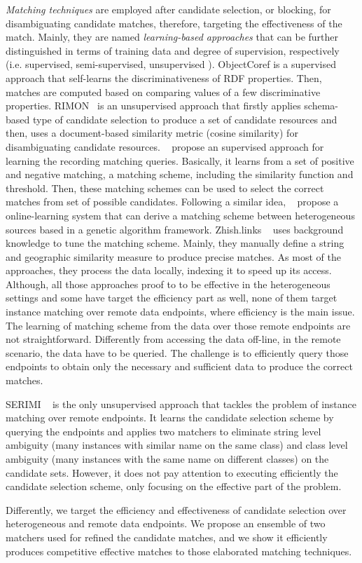 \emph{Matching techniques} are employed after candidate selection, or blocking, for disambiguating candidate matches, therefore, targeting the effectiveness of the match. Mainly, they are named \emph{learning-based approaches} that can be further distinguished in terms of training data and degree of supervision, respectively (i.e. supervised, semi-supervised, unsupervised \cite{bernstein_discovering_2009,Song:2011:AGD:2063016.2063058,Niu:2011:ZWC:2063076.2063091}). ObjectCoref\cite{hu_bootstrapping_2011} is a supervised approach that self-learns the discriminativeness of RDF properties. Then, matches are computed based on comparing values of a few discriminative properties. RIMON~\cite{juanzi_li_rimom:_2009} is an unsupervised approach that firstly applies schema-based type of candidate selection to produce a set of candidate resources and then, uses a document-based similarity metric (cosine similarity) for disambiguating candidate resources. ~\cite{DBLP:conf/vldb/ChaudhuriCGK07} propose an supervised approach for learning the recording matching queries. Basically, it learns from a set of positive and negative matching, a matching scheme, including the similarity function and threshold. Then, these matching schemes can be used to select the correct matches from set of possible candidates. Following a similar idea, ~\cite{DBLP:conf/esws/NikolovdM12} propose a online-learning system that can derive a matching scheme between heterogeneous sources based in a genetic algorithm framework. Zhish.links ~\cite{DBLP:conf/semweb/NiuRZW11} uses background knowledge to tune the matching scheme. Mainly, they manually define a string and geographic similarity measure to produce precise matches. As most of the approaches, they process the data locally, indexing it to speed up its access. Although, all those approaches proof to to be effective in the heterogeneous settings and some have target the efficiency part as well, none of them target instance matching over remote data endpoints, where efficiency is the main issue. The learning of matching scheme from the data over those remote endpoints are not straightforward. Differently from accessing the data off-line, in the remote scenario, the data have to be queried. The challenge is to efficiently query those endpoints to obtain only the necessary and sufficient data to produce the correct matches. 


SERIMI ~\cite{serimi} is the only unsupervised approach that tackles the problem of instance matching over remote endpoints. It learns the candidate selection scheme by querying the endpoints and applies two matchers to eliminate string level ambiguity (many instances with similar name on the same class) and class level ambiguity (many instances with the same name on different classes) on the candidate sets. However, it does not pay attention to executing efficiently the candidate selection scheme, only focusing on the effective part of the problem. 

Differently, we target the efficiency and effectiveness of candidate selection over heterogeneous and remote data endpoints. We propose an ensemble of two matchers used for refined the candidate matches, and we show it efficiently produces competitive effective matches to those elaborated matching techniques.

 